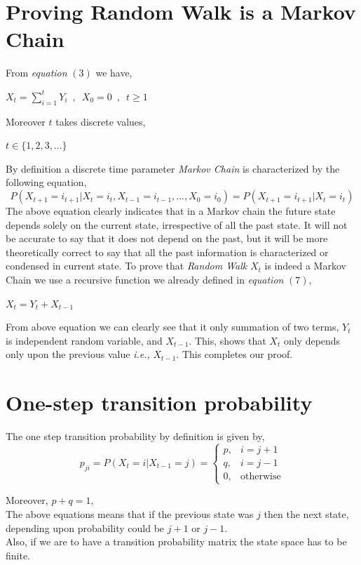 \documentclass[12pt,a4paper]{article}%
\begin{document}
 	\section{Proving Random Walk is a Markov Chain}
 	From \textit{equation} $(3)$ we have,
 	\begin{center}
 	$X_{t} = \sum_{{i=1}}^{t} Y_{i}\enspace , \enspace X_{0}=0\enspace ,\enspace t \geq 1$ 
 	\end{center}
 	Moreover $t$ takes discrete values,
 	\begin{center}
 		$t \in \{1,2,3,...\}$
 	\end{center}
 	By definition a discrete time parameter \textit{Markov Chain} is characterized by the following equation,
 	\begin{equation}
 		P(X_{t+1}=i_{t+1}|X_{t}=i_{t},X_{t-1}=i_{t-1},...,X_{0}=i_{0})=P(X_{t+1}=i_{t+1}|X_{t}=i_{t})
 	\end{equation}
 	The above equation clearly indicates that in a Markov chain the future state depends solely on the current state, irrespective of all the past state. It will not be accurate to say that it does not depend on the past, but it will be more theoretically correct to say that all the past information is characterized or condensed in current state. To prove that \textit{Random Walk} $X_{t}$ is indeed a Markov Chain we use a recursive function we already defined in \textit{equation} $(7)$,
 	\begin{center}
 		$X_{t}=Y_{t}+X_{t-1}$
 	\end{center}
 	From above equation we can clearly see that it only summation of two terms, $Y_{t}$ is independent random variable, and $X_{t-1}$. This, shows that $X_{t}$ only depends only upon the previous value \textit{i.e.,} $X_{t-1}$. This completes our proof.
 	\section{One-step transition probability}
 	The one step transition probability by definition is given by,
 	\begin{equation}
 		p_{ji}=P(X_{t}=i|X_{t-1}=j)=
 		\begin{cases}
 		p,& i=j+1\\
 		q,& i=j-1 \\
 		0,&\text{otherwise}
 		\end{cases}
 	\end{equation}
 	\begin{flushleft}
 		Moreover, $p+q=1$,\\\smallskip
 		The above equations means that if the previous state was $j$ then the next state, depending upon probability could be $j+1$ or $j-1$.\\\smallskip
 		Also, if we are to have a transition probability matrix the state space has to be finite.
 	\end{flushleft}
 	\pagebreak
\end{document}
